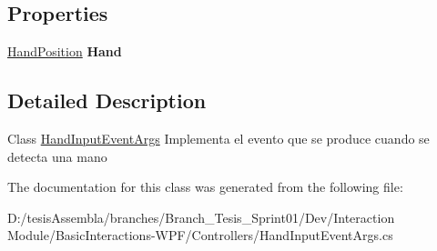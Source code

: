 \subsection*{Properties}
\begin{DoxyCompactItemize}
\item 
\hypertarget{class_microsoft_1_1_samples_1_1_kinect_1_1_basic_interactions_1_1_hand_input_event_args_a5703b62f8c7fb815138f96a0397f7e00}{\hyperlink{class_microsoft_1_1_samples_1_1_kinect_1_1_basic_interactions_1_1_hand_position}{Hand\-Position} {\bfseries Hand}}\label{class_microsoft_1_1_samples_1_1_kinect_1_1_basic_interactions_1_1_hand_input_event_args_a5703b62f8c7fb815138f96a0397f7e00}

\end{DoxyCompactItemize}


\subsection{Detailed Description}
Class \hyperlink{class_microsoft_1_1_samples_1_1_kinect_1_1_basic_interactions_1_1_hand_input_event_args}{Hand\-Input\-Event\-Args} Implementa el evento que se produce cuando se detecta una mano 

The documentation for this class was generated from the following file\-:\begin{DoxyCompactItemize}
\item 
D\-:/tesis\-Assembla/branches/\-Branch\-\_\-\-Tesis\-\_\-\-Sprint01/\-Dev/\-Interaction Module/\-Basic\-Interactions-\/\-W\-P\-F/\-Controllers/Hand\-Input\-Event\-Args.\-cs\end{DoxyCompactItemize}
